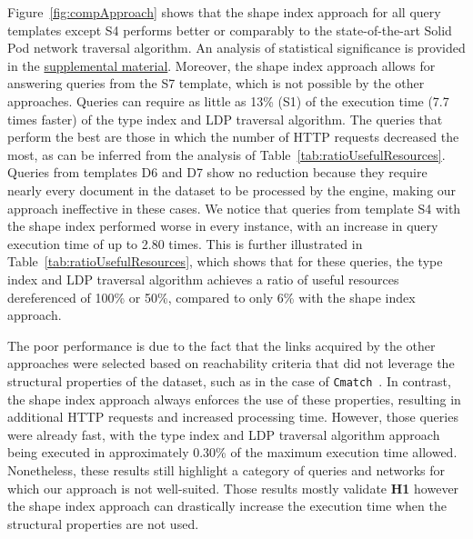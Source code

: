 Figure~\ref{fig:compApproach} shows that the shape index approach for all query templates except S4 performs better or comparably to the state-of-the-art Solid Pod network traversal algorithm.
An analysis of statistical significance is provided in the \hyperref[sec:supplementalMaterial]{supplemental material}.
Moreover, the shape index approach allows for answering queries from the S7 template, which is not possible by the other approaches.
Queries can require as little as 13\% (S1) of the execution time (7.7 times faster) of the type index and LDP traversal algorithm.
The queries that perform the best are those in which the number of HTTP requests decreased the most, as can be inferred from the analysis of Table~\ref{tab:ratioUsefulResources}.
Queries from templates D6 and D7 show no reduction because they require nearly every document in the dataset to be processed by the engine, making our approach ineffective in these cases.
We notice that queries from template S4 with the shape index performed worse in every instance, with an increase in query execution time of up to 2.80 times.
This is further illustrated in Table~\ref{tab:ratioUsefulResources}, which shows that for these queries, the type index and LDP traversal algorithm achieves a ratio of useful resources dereferenced of 100\% or 50\%, compared to only 6\% with the shape index approach.

The poor performance is due to the fact that the links acquired by the other approaches were selected based on reachability criteria that did not leverage the structural properties of the dataset, such as in the case of \texttt{Cmatch}~\cite{hartig2016walking}.
In contrast, the shape index approach always enforces the use of these properties, resulting in additional HTTP requests and increased processing time.
However, those queries were already fast, with the type index and LDP traversal algorithm approach being executed in approximately 0.30\% of the maximum execution time allowed.
Nonetheless, these results still highlight a category of queries and networks for which our approach is not well-suited.
Those results mostly validate \textbf{H1} however the shape index approach can drastically increase the execution time when the structural properties are not used.

